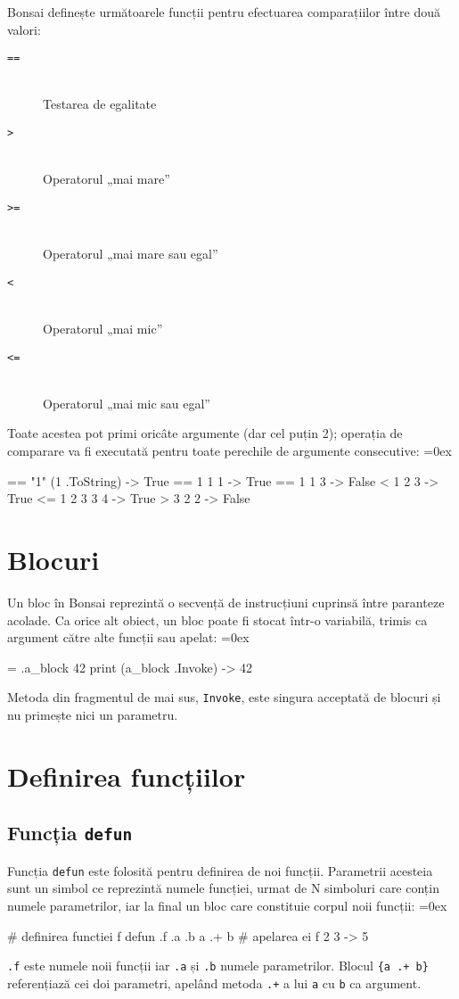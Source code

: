 \documentclass[12pt,a4paper]{memoir}
\renewcommand{\c}{\texttt}
\newenvironment{code}
{
\definecolor{shadecolor}{gray}{0.91}
\topsep=0ex
\relax
\shaded
\verbatim
}
{
\endverbatim
\endshaded
}
\begin{document}
Bonsai definește următoarele funcții pentru efectuarea comparațiilor între două valori:

\begin{description}
\item[\c{==}]\hfill\\Testarea de egalitate
\item[\c{>}]\hfill\\Operatorul „mai mare”
\item[\c{>=}]\hfill\\Operatorul „mai mare sau egal”
\item[\c{<}]\hfill\\Operatorul „mai mic”
\item[\c{<=}]\hfill\\Operatorul „mai mic sau egal”
\end{description}

Toate acestea pot primi oricâte argumente (dar cel puțin 2); operația de comparare va fi executată pentru toate perechile de argumente consecutive:
\begin{code}
== "1" (1 .ToString)
  -> True
== 1 1 1
  -> True
== 1 1 3
  -> False
< 1 2 3
  -> True
<= 1 2 3 3 4
  -> True
> 3 2 2
  -> False
\end{code}

\section{Blocuri}

Un bloc în Bonsai reprezintă o secvență de instrucțiuni cuprinsă între paranteze acolade. Ca orice alt obiect, un bloc poate fi stocat într-o variabilă, trimis ca argument către alte funcții sau apelat:
\begin{code}
= .a_block { 42 }
print (a_block .Invoke)
  -> 42
\end{code}
Metoda din fragmentul de mai sus, \c{Invoke}, este singura acceptată de blocuri și nu primește nici un parametru. 

\section{Definirea funcțiilor}\label{sec:defun}

\subsection{Funcția \c{defun}}

Funcția \c{defun} este folosită pentru definirea de noi funcții. Parametrii acesteia sunt un simbol ce reprezintă numele funcției, urmat de N simboluri care conțin numele parametrilor, iar la final un bloc care constituie corpul noii funcții:
\begin{code}
# definirea functiei f
defun .f .a .b {
  a .+ b 
}
# apelarea ei
f 2 3
  -> 5
\end{code}
\c{.f} este numele noii funcții iar \c{.a} și \c{.b} numele parametrilor. Blocul \c{\{a .+ b\}} referențiază cei doi parametri, apelând metoda \c{.+} a lui \c{a} cu \c{b} ca argument.
\end{document}
